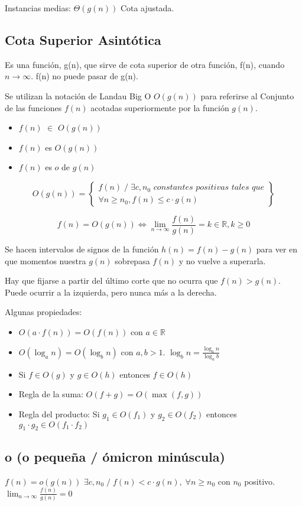 Instancias medias: $\Theta\left(g\left(n\right)\right)$ Cota ajustada.

\subsection{Cota Superior Asintótica}
Es una función, g(n), que sirve de cota superior de otra función, f(n), cuando $n\rightarrow \infty$. f(n) no puede pasar de g(n).

Se utilizan la notación de Landau Big O $O(g(n))$ para referirse al Conjunto de las funciones $f(n)$ acotadas superiormente por la función $g(n)$.
\begin{itemize}
  \item $f(n)$ $\in$ $O(g(n))$
  \item $f(n)$ es $O(g(n))$
  \item $f(n)$ es $o$ de $g(n)$
\end{itemize}

$$O(g(n))=\left\{\begin{matrix}
  f(n)\;/\;\exists c, n_0 \textit{ constantes positivas tales que}  \\
  \forall n \geq n_0, f(n) \leq c \cdot g(n)
  \end{matrix}\right\}$$

$$f(n)=O(g(n)) \Leftrightarrow \lim_{n \rightarrow \infty} \frac{f(n)}{g(n)}= k \in \mathbb{R}, k \geq 0$$

Se hacen intervalos de signos de la función $h(n) = f(n)-g(n)$ para ver en que momentos nuestra $g(n)$ sobrepasa $f(n)$ y no vuelve a superarla.

Hay que fijarse a partir del último corte que no ocurra que $f(n) > g(n)$. Puede ocurrir a la izquierda, pero nunca más a la derecha.

Algunas propiedades:
\begin{itemize}
  \item $O(a \cdot f(n))= O(f(n))$ con $a \in \mathbb{R}$
  \item $O(\log_a n) = O(\log_b n)$ con $a,b > 1$. $\log_b n = \frac{\log_a n}{\log_a b}$
  \item Si $f \in O(g)$ y $g \in O(h)$ entonces $f \in O(h)$
  \item Regla de la suma: $O(f+g)=O(\max(f, g))$
  \item Regla del producto: Si $g_1 \in O(f_1)$ y $g_2 \in O(f_2)$ entonces $g_1 \cdot g_2 \in O(f_1 \cdot f_2)$
\end{itemize}

\subsection{o (o pequeña / ómicron minúscula)}
$f(n)=o(g(n))$ $\exists c, n_0\;/\; f(n)<c\cdot g(n), \; \forall n \geq n_0$ con $n_0$ positivo. $\lim_{n \rightarrow \infty} \frac{f(n)}{g(n)}=0$

